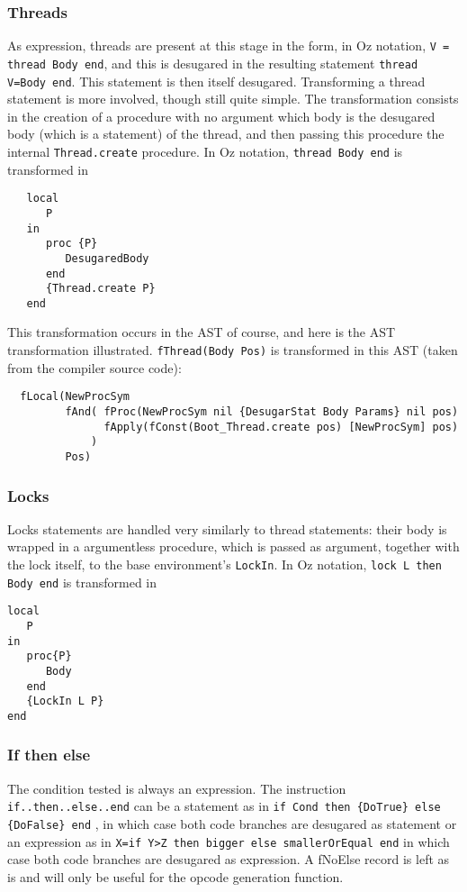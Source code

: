 \documentclass[a4paper]{memoir}
\begin{document}
\subsubsection{Threads}
As expression, threads are present at this stage in the form, in Oz notation, \lstinline!V = thread Body end!, and this is desugared in the resulting statement \lstinline!thread V=Body end!. This statement is then itself desugared.
Transforming a thread statement is more involved, though still quite simple. The transformation consists in the creation of a procedure with no argument which body is the desugared body (which is a statement) of the thread, and then passing this procedure the internal \lstinline!Thread.create! procedure.
In Oz notation, \lstinline!thread Body end! is transformed in 
\begin{lstlisting}
   local 
      P 
   in 
      proc {P} 
         DesugaredBody 
      end 
      {Thread.create P}
   end
\end{lstlisting}
This transformation occurs in the AST of course, and here is the AST transformation illustrated. \lstinline!fThread(Body Pos)! is transformed in this AST (taken from the compiler source code):
\begin{lstlisting}
  fLocal(NewProcSym 
         fAnd( fProc(NewProcSym nil {DesugarStat Body Params} nil pos) 
               fApply(fConst(Boot_Thread.create pos) [NewProcSym] pos)
             ) 
         Pos)
\end{lstlisting}

\subsubsection{Locks}
Locks statements are handled very similarly to thread statements: their body is
wrapped in a argumentless procedure, which is passed as argument, together with
the lock itself, to the base environment's \lstinline!LockIn!. In Oz notation, \lstinline!lock L then Body end! is transformed in
\begin{lstlisting}
local
   P
in
   proc{P}
      Body
   end
   {LockIn L P}
end
\end{lstlisting}


\subsubsection{If then else}
The condition tested is always an expression.
The instruction \lstinline!if..then..else..end! can be a statement as in 
\lstinline!if Cond then {DoTrue} else {DoFalse} end!
, in which case both code branches are desugared as statement
or an expression as in
\lstinline!X=if Y>Z then bigger else smallerOrEqual end!
in which case both code branches are desugared as expression.
A fNoElse record is left as is and will only be useful for the opcode generation function.
\end{document}
